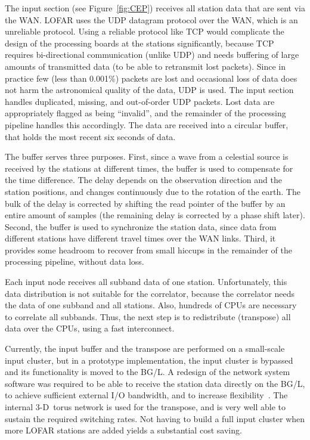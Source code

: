 \documentclass[journal]{IEEEtran}
\begin{document}
The input section (see Figure~\ref{fig:CEP}) receives all station data that
are sent via the WAN.
LOFAR uses the UDP datagram protocol over the WAN, which is an unreliable
protocol.
Using a reliable protocol like TCP would complicate the design of the
processing boards at the stations significantly, because TCP requires
bi-directional communication (unlike UDP) and needs buffering of large amounts
of transmitted data (to be able to retransmit lost packets).
Since in practice few (less than 0.001\%) packets are lost and occasional loss
of data does not harm the astronomical quality of the data, UDP is used.
The input section handles duplicated, missing, and out-of-order UDP packets.
Lost data are appropriately flagged as being ``invalid'', and the remainder
of the processing pipeline handles this accordingly.
The data are received into a circular buffer, that holds the most recent
six seconds of data.

The buffer serves three purposes.
First, since a wave from a celestial source is received by the stations at
different times, the buffer is used to compensate for the time difference.
The delay depends on the observation direction and the station positions,
and changes continuously due to the rotation of the earth.
The bulk of the delay is corrected by shifting the read pointer of the buffer
by an entire amount of samples (the remaining delay is corrected by a phase
shift later).
Second, the buffer is used to synchronize the station data, since data from
different stations have different travel times over the WAN links.
Third, it provides some headroom to recover from small hiccups in the
remainder of the processing pipeline, without data loss.

Each input node receives all subband data of one station.
Unfortunately, this data distribution is not suitable for the correlator,
because the correlator needs the data of one subband and all stations.
Also, hundreds of CPUs are necessary to correlate all subbands.
Thus, the next step is to redistribute (transpose) all data over the CPUs,
using a fast interconnect.

Currently, the input buffer and the transpose are performed on a small-scale
input cluster, but in a prototype implementation, the input cluster is
bypassed and its functionality is moved to the BG/L.
A redesign of the network system software was required to be able to
receive the station data directly on the BG/L, to achieve sufficient
external I/O bandwidth, and to increase flexibility~\cite{Iskra:08}.
The internal 3-D~torus network is used for the transpose, and is very well able
to sustain the required switching rates.
Not having to build a full input cluster when more LOFAR stations are added
yields a substantial cost saving.
\end{document}
